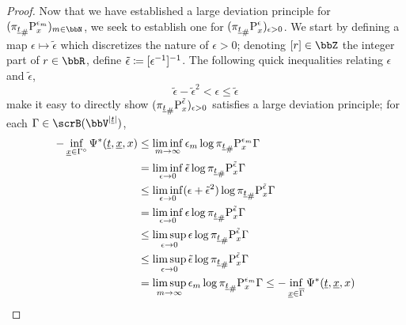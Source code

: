 \begin{proof}
  Now that we have established a large deviation principle for $(\push{\Prb^{\epsilon_m}_\stateVar}{\pi_{\underline t}})_{m\in\bbN}$, we seek to establish one for $(\push{\Prb^\epsilon_\stateVar}{\pi_{\underline t}})_{\epsilon>0}$.
  We start by defining a map $\epsilon \mapsto \tilde\epsilon$ which discretizes the nature of $\epsilon > 0$; denoting $[r] \in \bbZ$ the integer part of $r \in \bbR$, define $\tilde\epsilon \defeq [\epsilon^{-1}]^{-1}$.
  The following quick inequalities relating $\epsilon$ and $\tilde\epsilon$,
  \begin{equation*}
    \tilde\epsilon - \tilde\epsilon^2 < \epsilon \leq \tilde\epsilon
  \end{equation*}
  make it easy to directly show $(\push{\Prb^{\tilde\epsilon}_\stateVar}{\pi_{\underline t}})_{\epsilon>0}$ satisfies a large deviation principle; for each $\Gamma \in \scrB(\vecSpace^{|\underline t|})$,
  \begin{align*}
    -\inf_{\underline\stateVar \in \Gamma^\circ} \aff^*(\underline t, \underline\stateVar, \stateVar) 
    &\leq \liminf_{m\rightarrow\infty} \epsilon_m \log \push{\Prb^{\epsilon_m}_\stateVar}{\pi_{\underline t}} \Gamma \\
    &= \liminf_{\epsilon\rightarrow0} \tilde\epsilon \log \push{\Prb^{\tilde\epsilon}_\stateVar}{\pi_{\underline t}} \Gamma \\
    &\leq \liminf_{\epsilon\rightarrow0} (\epsilon + \tilde\epsilon^2) \log \push{\Prb^{\tilde\epsilon}_\stateVar}{\pi_{\underline t}} \Gamma \\ 
    &= \liminf_{\epsilon\rightarrow0} \epsilon \log \push{\Prb^{\tilde\epsilon}_\stateVar}{\pi_{\underline t}} \Gamma \\
    &\leq \limsup_{\epsilon\rightarrow0} \epsilon \log \push{\Prb^{\tilde\epsilon}_\stateVar}{\pi_{\underline t}} \Gamma \\
    &\leq \limsup_{\epsilon\rightarrow0} \tilde\epsilon \log \push{\Prb^{\tilde\epsilon}_\stateVar}{\pi_{\underline t}} \Gamma \\
    &= \limsup_{m\rightarrow\infty} \epsilon_m \log \push{\Prb^{\epsilon_m}_\stateVar}{\pi_{\underline t}} \Gamma 
    \leq -\inf_{\underline\stateVar \in \overline\Gamma} \aff^*(\underline t, \underline\stateVar, \stateVar)
  \end{align*}


\end{proof}
